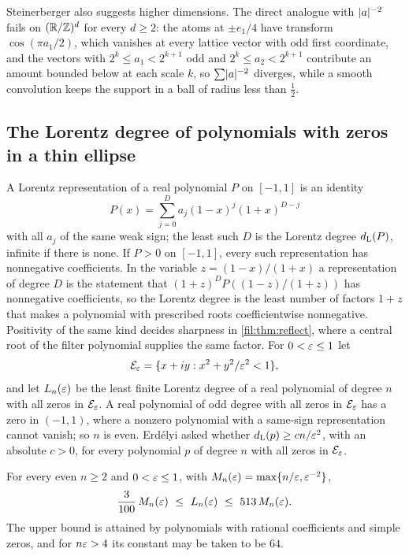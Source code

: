 \begin{remark}\label{zfg:rem:dim}
Steinerberger also suggests higher dimensions. The direct analogue with $\lvert a\rvert^{-2}$ fails on $(\mathbb{R}/\mathbb{Z})^d$ for every $d\ge2$:
the atoms at $\pm e_1/4$ have transform $\cos(\pi a_1/2)$, which vanishes at every lattice vector with odd first
coordinate, and the vectors with $2^k\le a_1<2^{k+1}$ odd and $2^k\le a_2<2^{k+1}$ contribute an amount bounded below at each
scale $k$, so $\sum\lvert a\rvert^{-2}$ diverges, while a smooth convolution keeps the support in a ball of radius less than $\tfrac12$.
\end{remark}

\subsection{The Lorentz degree of polynomials with zeros in a thin ellipse}\label{zfg:sec:lorentz}

A Lorentz representation of a real polynomial $P$ on $[-1,1]$ is an identity
\[
 P(x)=\sum_{j=0}^Da_j(1-x)^j(1+x)^{D-j}
\]
with all $a_j$ of the same weak sign; the least such $D$ is the Lorentz degree $d_{\mathrm L}(P)$, infinite if there is none. If $P>0$
on $[-1,1]$, every such representation has nonnegative coefficients. In the variable $z=(1-x)/(1+x)$ a representation of
degree $D$ is the statement that $(1+z)^DP((1-z)/(1+z))$ has nonnegative coefficients, so the Lorentz degree is the least
number of factors $1+z$ that makes a polynomial with prescribed roots coefficientwise nonnegative. Positivity of the same kind decides sharpness in
\cref{fil:thm:reflect}, where a central root of the filter polynomial supplies the same factor. For $0<\varepsilon\le1$ let
\[
 \mathcal E_\varepsilon=\{x+iy:x^2+y^2/\varepsilon^2<1\},
\]
and let $L_n(\varepsilon)$ be the least finite Lorentz degree of a real polynomial of degree $n$ with all zeros in $\mathcal E_\varepsilon$.
A real polynomial of odd degree with all zeros in $\mathcal E_\varepsilon$ has a zero in $(-1,1)$, where a nonzero polynomial with a
same-sign representation cannot vanish; so $n$ is even. Erd\'elyi \cite[\S8, p.~197]{Erdelyi1991Estimates} asked whether
$d_{\mathrm L}(p)\ge cn/\varepsilon^2$, with an absolute $c>0$, for every polynomial $p$ of degree $n$ with all zeros in $\mathcal E_\varepsilon$.

\begin{theorem}\label{zfg:thm:lorentz}
For every even $n\ge2$ and $0<\varepsilon\le1$, with $M_n(\varepsilon)=\max\{n/\varepsilon,\varepsilon^{-2}\}$,
\[
 \frac3{100}\,M_n(\eps)\ \le\ L_n(\eps)\ \le\ 513\,M_n(\eps).
\]
The upper bound is attained by polynomials with rational coefficients and simple zeros, and for $n\varepsilon>4$ its constant
may be taken to be $64$.
\end{theorem}

